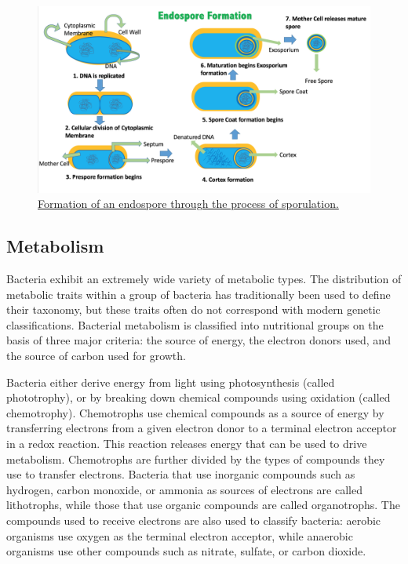 \begin{figure}

{\centering \includegraphics[width=0.7\linewidth]{./figures/bacteria/Endospore_Formation} 

}

\caption{\href{https://commons.wikimedia.org/wiki/File:Endospore_Formation.png}{Formation of an endospore through the process of sporulation.}}\label{fig:endosporeform}
\end{figure}

\hypertarget{metabolism-1}{%
\subsection{Metabolism}\label{metabolism-1}}

Bacteria exhibit an extremely wide variety of metabolic types. The distribution of metabolic traits within a group of bacteria has traditionally been used to define their taxonomy, but these traits often do not correspond with modern genetic classifications. Bacterial metabolism is classified into nutritional groups on the basis of three major criteria: the source of energy, the electron donors used, and the source of carbon used for growth.

Bacteria either derive energy from light using photosynthesis (called phototrophy), or by breaking down chemical compounds using oxidation (called chemotrophy). Chemotrophs use chemical compounds as a source of energy by transferring electrons from a given electron donor to a terminal electron acceptor in a redox reaction. This reaction releases energy that can be used to drive metabolism. Chemotrophs are further divided by the types of compounds they use to transfer electrons. Bacteria that use inorganic compounds such as hydrogen, carbon monoxide, or ammonia as sources of electrons are called lithotrophs, while those that use organic compounds are called organotrophs. The compounds used to receive electrons are also used to classify bacteria: aerobic organisms use oxygen as the terminal electron acceptor, while anaerobic organisms use other compounds such as nitrate, sulfate, or carbon dioxide.

